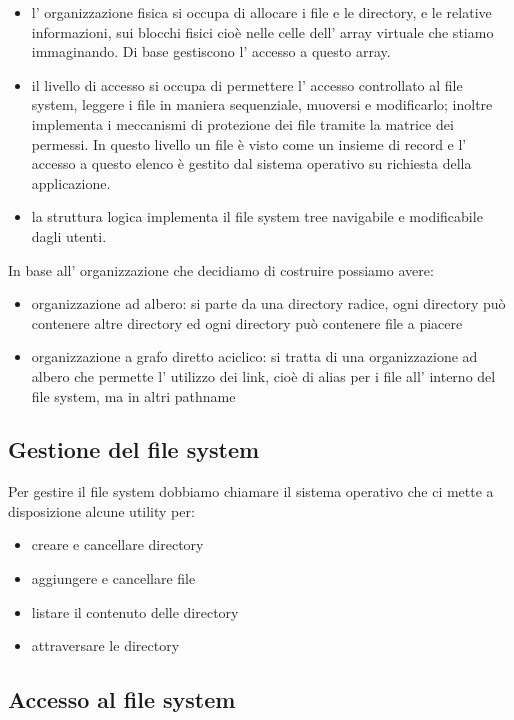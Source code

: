 {\begin{itemize}
    \item l' organizzazione fisica si occupa di allocare i file e le directory, e le relative informazioni, sui blocchi fisici cioè nelle celle dell' array virtuale che stiamo immaginando.
    Di base gestiscono l' accesso a questo array.

    \item il livello di accesso si occupa di permettere l' accesso controllato al file system, leggere i file in maniera sequenziale, muoversi e modificarlo; inoltre implementa i meccanismi di protezione dei file tramite la matrice dei permessi.
    In questo livello un file è visto come un insieme di record e l' accesso a questo elenco è gestito dal sistema operativo su richiesta della applicazione.

    \item la struttura logica implementa il file system tree navigabile e modificabile dagli utenti.
\end{itemize}

In base all' organizzazione che decidiamo di costruire possiamo avere:
\begin{itemize}
    \item organizzazione ad albero: si parte da una directory radice, ogni directory può contenere altre directory ed ogni directory può contenere file a piacere
    
    \item organizzazione a grafo diretto aciclico: si tratta di una organizzazione ad albero che permette l' utilizzo dei link, cioè di alias per i file all' interno del file system, ma in altri pathname
\end{itemize}

\subsection{Gestione del file system}
Per gestire il file system dobbiamo chiamare il sistema operativo che ci mette a disposizione alcune utility per:
\begin{itemize}
    \item creare e cancellare directory
    \item aggiungere e cancellare file
    \item listare il contenuto delle directory
    \item attraversare le directory
\end{itemize}

\subsection{Accesso al file system}
}
